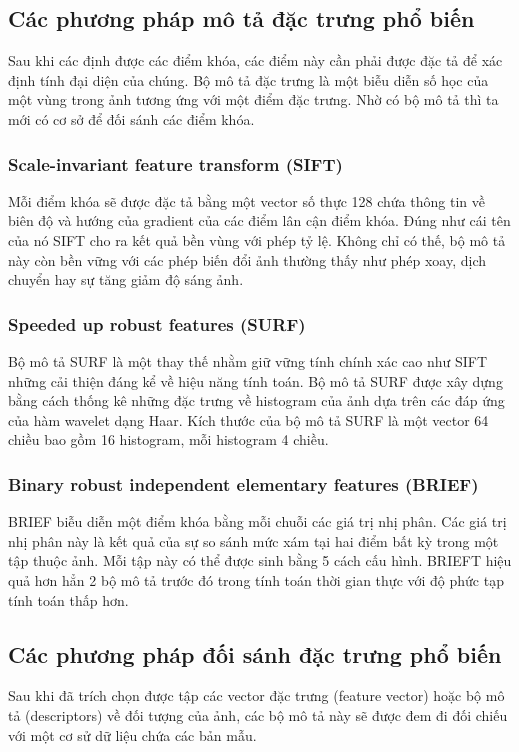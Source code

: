 \subsection{Các phương pháp mô tả đặc trưng phổ biến}
Sau khi các định được các điểm khóa, các điểm này cần phải được đặc tả để xác định tính đại diện của chúng. Bộ mô tả đặc trưng là một biễu diễn số học của một vùng trong ảnh tương ứng với một điểm đặc trưng. Nhờ có bộ mô tả thì ta mới có cơ sở để đối sánh các điểm khóa.

\subsubsection{Scale-invariant feature transform (SIFT)}
Mỗi điểm khóa sẽ được đặc tả bằng một vector số thực 128 chứa thông tin về biên độ và hướng của gradient của các điểm lân cận điểm khóa. Đúng như cái tên của nó SIFT cho ra kết quả bền vùng với phép tỷ lệ. Không chỉ có thế, bộ mô tả này còn bền vững với các phép biến đổi ảnh thường thấy như phép xoay, dịch chuyển hay sự tăng giảm độ sáng ảnh.

\subsubsection{Speeded up robust features (SURF)}
Bộ mô tả SURF là một thay thế nhằm giữ vững tính chính xác cao như SIFT những cải thiện đáng kể về hiệu năng tính toán. Bộ mô tả SURF được xây dựng bằng cách thống kê những đặc trưng về histogram của ảnh dựa trên các đáp ứng của hàm wavelet dạng Haar. Kích thước của bộ mô tả SURF là một vector 64 chiều bao gồm 16 histogram, mỗi histogram 4 chiều.

\subsubsection{Binary robust independent elementary features (BRIEF)}

BRIEF biễu diễn một điểm khóa bằng mỗi chuỗi các giá trị nhị phân. Các giá trị nhị phân này là kết quả của sự so sánh mức xám tại hai điểm bất kỳ trong một tập thuộc ảnh. Mỗi tập này có thể được sinh bằng 5 cách cấu hình. BRIEFT hiệu quả hơn hẳn 2 bộ mô tả trước đó trong tính toán thời gian thực với độ phức tạp tính toán thấp hơn.

\subsection{Các phương pháp đối sánh đặc trưng phổ biến}
Sau khi đã trích chọn được tập các vector đặc trưng (feature vector) hoặc bộ mô tả (descriptors) về đối tượng của ảnh, các bộ mô tả này sẽ được đem đi đối chiếu với một cơ sử dữ liệu chứa các bản mẫu.

